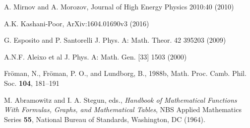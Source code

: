\documentclass[atmp]{ipart_v1}
\begin{document}
\begin{thebibliography}{30}
 A. Mirnov and A. Morozov, Journal of High Energy Physics 2010:40 (2010)

 A.K. Kashani-Poor, ArXiv:1604.01690v3 (2016)

 G. Esposito and P. Santorelli J. Phys. A: Math. Theor. 42 395203 (2009)

 A.N.F. Aleixo et al J. Phys. A: Math. Gen. [33] 1503 (2000)

 Fr\"oman, N., Fr\"oman, P. O., and Lundborg, B., 1988b, 
Math. Proc. Camb. Phil. Soc. \textbf{104}, 181–191

 M. Abramowitz and I. A. Stegun, eds., 
{\it Handbook of Mathematical Functions With Formulas, Graphs, and Mathematical Tables}, 
NBS Applied Mathematics Series \textbf{55}, National Bureau of Standards, Washington, DC (1964).

\end{thebibliography}
\end{document}
